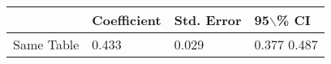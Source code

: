 \begin{table}[ht]
\centering
\begin{tabular}{rlll}
  \hline
 & Coefficient & Std. Error & 95$\backslash$\% CI \\ 
  \hline
Same Table & 0.433 & 0.029 & 0.377 0.487 \\ 
   \hline
\end{tabular}
\end{table}
